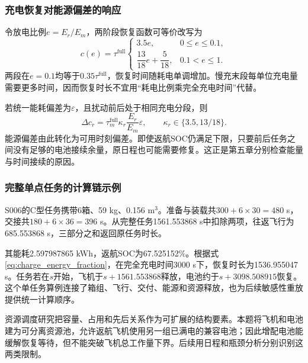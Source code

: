 \subsubsection{充电恢复对能源偏差的响应}
令放电比例$e=E_r/E_m$，两阶段恢复函数可等价改写为
\begin{equation}
 c(e)=\tau^{\mathrm{full}}
 \begin{cases}
 3.5e,&0\le e\le0.1,\\
 \dfrac{13}{18}e+\dfrac5{18},&0.1<e\le1.
 \end{cases}
\label{eq:charge_energy_fraction}
\end{equation}
两段在$e=0.1$均等于$0.35\tau^{\mathrm{full}}$，恢复时间随耗电单调增加。慢充末段每单位充电量需要更多时间，因而恢复时长不宜用“耗电比例乘完全充电时间”代替。

若统一能耗偏差为$\varepsilon$，且扰动前后处于相同充电分段，则
\begin{equation}
 \Delta c_r=\tau_m^{\mathrm{full}}\kappa_r\frac{E_r}{E_m}\varepsilon,
 \qquad \kappa_r\in\{3.5,13/18\}.
\label{eq:charge_local_perturbation}
\end{equation}
能源偏差由此转化为可用时刻偏差。即使返航SOC仍满足下限，只要前后任务之间没有足够的电池接续余量，原日程也可能需要修复。这正是第五章分别检查能量与时间接续的原因。

\subsubsection{完整单点任务的计算链示例}
S006的C型任务携带6箱、59 kg、0.156 m$^3$。准备与装载共$300+6\times30=480$ s，交接共$180+6\times36=396$ s。从完整任务1561.553868 s中扣除两项，往返飞行为685.553868 s，三部分之和返回原任务时长。

其能耗2.597987865 kWh，返航SOC为67.525152\%。根据式\eqref{eq:charge_energy_fraction}，在完全充电时间3000 s下，恢复时长为1536.955047 s。任务若在$s$开始，飞机于$s+1561.553868$释放，电池约于$s+3098.508915$恢复。这个单任务算例连接了箱组、飞行、交付、能源和资源释放，也为后续敏感性重放提供统一计算顺序。

资源调度研究把容量、占用和先后关系作为可扩展的结构要素\cite{hartmann2022}。本题将飞机和电池建为可分离资源池，允许返航飞机使用另一组已满电的兼容电池；因此增配电池能缓解恢复等待，但不能突破飞机总工作量下界。后续用日程和瓶颈分析分别识别这两类限制。
